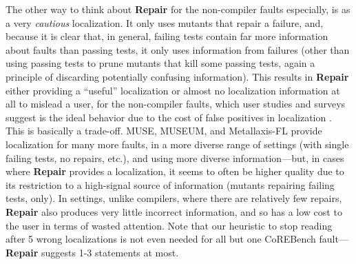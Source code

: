 The other way to think about {\bf Repair} for the non-compiler faults especially, is as a very \emph{cautious} localization.  It only uses mutants that repair a failure, and, because it is clear that, in general, failing tests contain far more information about faults than passing tests, it only uses information from failures (other than using passing tests to prune mutants that kill some passing tests, again a principle of discarding potentially confusing information).  This results in {\bf Repair} either providing a ``useful'' localization or almost no localization information at all to mislead a user, for the non-compiler faults, which user studies and surveys suggest is the ideal behavior due to the cost of false positives in localization \cite{AutoHelp,Kochhar}.  This is basically a trade-off.  MUSE, MUSEUM, and Metallaxis-FL provide localization for many more faults, in a more diverse range of settings (with single failing tests, no repairs, etc.), and using more diverse information---but, in cases where {\bf Repair} provides a localization, it seems to often be higher quality due to its restriction to a high-signal source of information (mutants repairing failing tests, only).  In settings, unlike compilers, where there are relatively few repairs, {\bf Repair} also produces very little incorrect information, and so has a low cost to the user in terms of wasted attention.  Note that our heuristic to stop reading after 5 wrong localizations is not even needed for all but one CoREBench fault---{\bf Repair} suggests 1-3 statements at most.

